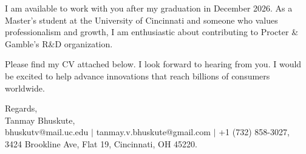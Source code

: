 \documentclass[11pt]{letter}
\begin{document}
\begin{letter}{}
I am available to work with you after my graduation in December 2026. As a Master's student at the University of Cincinnati and someone who values professionalism and growth, I am enthusiastic about contributing to Procter \& Gamble's R\&D organization.

Please find my CV attached below. I look forward to hearing from you. I would be excited to help advance innovations that reach billions of consumers worldwide.

{\setlength{\parskip}{0pt}
Regards,\\
Tanmay Bhuskute,\\
bhuskutv@mail.uc.edu $\mid$ tanmay.v.bhuskute@gmail.com $\mid$ +1 (732) 858-3027,\\
3424 Brookline Ave, Flat 19, Cincinnati, OH 45220.
}

\end{letter}
\end{document}
